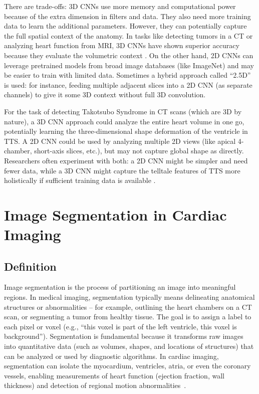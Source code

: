 \documentclass[12pt, BSc]{muthesis}
\begin{document}
There are trade-offs: 3D CNNs use more memory and computational power because of the extra dimension in filters and data. They also need more training data to learn the additional parameters. However, they can potentially capture the full spatial context of the anatomy. In tasks like detecting tumors in a CT or analyzing heart function from MRI, 3D CNNs have shown superior accuracy because they evaluate the volumetric context \cite{cciccek20163d}. On the other hand, 2D CNNs can leverage pretrained models from broad image databases (like ImageNet) and may be easier to train with limited data. Sometimes a hybrid approach called “2.5D” is used: for instance, feeding multiple adjacent slices into a 2D CNN (as separate channels) to give it some 3D context without full 3D convolution.



For the task of detecting Takotsubo Syndrome in CT scans (which are 3D by nature), a 3D CNN approach could analyze the entire heart volume in one go, potentially learning the three-dimensional shape deformation of the ventricle in TTS. A 2D CNN could be used by analyzing multiple 2D views (like apical 4-chamber, short-axis slices, etc.), but may not capture global shape as directly. Researchers often experiment with both: a 2D CNN might be simpler and need fewer data, while a 3D CNN might capture the telltale features of TTS more holistically if sufficient training data is available \cite{shen2017deep}.


\section{Image Segmentation in Cardiac Imaging}

\subsection{Definition}
Image segmentation is the process of partitioning an image into meaningful regions. In medical imaging, segmentation typically means delineating anatomical structures or abnormalities – for example, outlining the heart chambers on a CT scan, or segmenting a tumor from healthy tissue. The goal is to assign a label to each pixel or voxel (e.g., “this voxel is part of the left ventricle, this voxel is background”). Segmentation is fundamental because it transforms raw images into quantitative data (such as volumes, shapes, and locations of structures) that can be analyzed or used by diagnostic algorithms. In cardiac imaging, segmentation can isolate the myocardium, ventricles, atria, or even the coronary vessels, enabling measurements of heart function (ejection fraction, wall thickness) and detection of regional motion abnormalities~\cite{Chen2020Deep, suetens2017fundamentals, pham2000current}.
\end{document}

